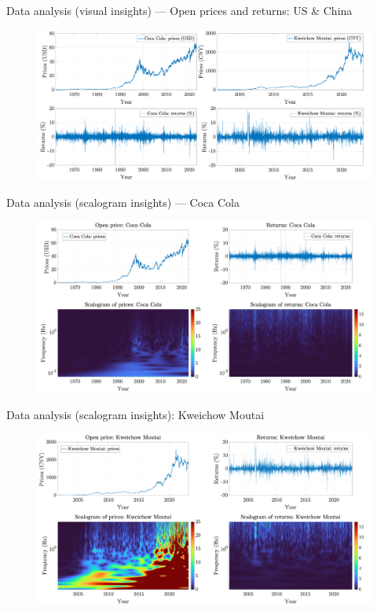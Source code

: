 \documentclass[11pt, aspectratio= 169]{beamer}
\begin{document}
	\begin{frame}{Data analysis (visual insights) --- Open prices and returns: US \& China}
		\begin{figure}[H]
			\includegraphics[width= 14cm]{visual_insight.png}
		\end{figure}
	\end{frame}

	\begin{frame}{Data analysis (scalogram insights) --- Coca Cola}
		\begin{figure}[H]
			\includegraphics[width= 14cm]{scalogram_insights_us.png}
		\end{figure}
	\end{frame}

	\begin{frame}{Data analysis (scalogram insights): Kweichow Moutai}
		\begin{figure}[H]
			\includegraphics[width= 14cm]{scalogram_insights_china.png}
		\end{figure}
	\end{frame}
\end{document}
